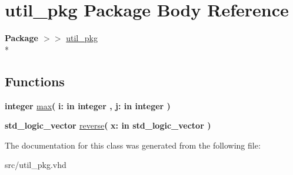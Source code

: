 \hypertarget{class__util__pkg}{\section{util\-\_\-pkg Package Body Reference}
\label{class__util__pkg}
}
{\bfseries Package $>$$>$ }\hyperlink{classutil__pkg}{util\-\_\-pkg}\\*
\subsection*{Functions}
 \begin{DoxyCompactItemize}
\item 
\hypertarget{class__util__pkg_a75d57d42f413f4f44fe472e114c76b50}{{\bfseries {\bfseries \textcolor{comment}{integer}\textcolor{vhdlchar}{ }}} \hyperlink{class__util__pkg_a75d57d42f413f4f44fe472e114c76b50}{max}{\bfseries  ( }{\bfseries \textcolor{vhdlchar}{i\-: }\textcolor{stringliteral}{in }{\bfseries \textcolor{comment}{integer}\textcolor{vhdlchar}{ }}}{\bfseries  , \textcolor{vhdlchar}{j\-: }\textcolor{stringliteral}{in }{\bfseries \textcolor{comment}{integer}\textcolor{vhdlchar}{ }}}{\bfseries  )} }\label{class__util__pkg_a75d57d42f413f4f44fe472e114c76b50}

\item 
\hypertarget{class__util__pkg_a9abf89c3351a7e2c76ffa1943ab815e0}{{\bfseries {\bfseries \textcolor{comment}{std\-\_\-logic\-\_\-vector}\textcolor{vhdlchar}{ }}} \hyperlink{class__util__pkg_a9abf89c3351a7e2c76ffa1943ab815e0}{reverse}{\bfseries  ( }{\bfseries \textcolor{vhdlchar}{x\-: }\textcolor{stringliteral}{in }{\bfseries \textcolor{comment}{std\-\_\-logic\-\_\-vector}\textcolor{vhdlchar}{ }}}{\bfseries  )} }\label{class__util__pkg_a9abf89c3351a7e2c76ffa1943ab815e0}

\end{DoxyCompactItemize}


The documentation for this class was generated from the following file\-:\begin{DoxyCompactItemize}
\item 
src/util\-\_\-pkg.\-vhd\end{DoxyCompactItemize}
